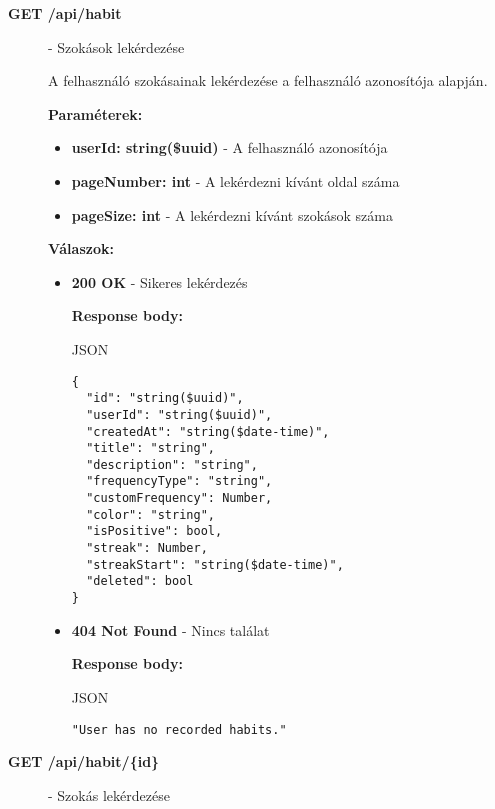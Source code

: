 \documentclass[12pt]{report}
\begin{document}
\begin{description}
  \item[\textbf{GET /api/habit}] - Szokások lekérdezése

    \vspace{0.5cm}
    A felhasználó szokásainak lekérdezése a felhasználó azonosítója alapján.

    \vspace{0.5cm}
    \textbf{Paraméterek:}
    \begin{itemize}
      \item \textbf{userId: string(\$uuid)} - A felhasználó azonosítója
      \item \textbf{pageNumber: int} - A lekérdezni kívánt oldal száma
      \item \textbf{pageSize: int} - A lekérdezni kívánt szokások száma
    \end{itemize}

    \vspace{0.5cm}
    \textbf{Válaszok:}
    \begin{itemize}
      \item \textbf{200 OK} - Sikeres lekérdezés

        \textbf{Response body:}
        \begin{codeblock}{JSON}
          \begin{verbatim}
{
  "id": "string($uuid)",
  "userId": "string($uuid)",
  "createdAt": "string($date-time)",
  "title": "string",
  "description": "string",
  "frequencyType": "string",
  "customFrequency": Number,
  "color": "string",
  "isPositive": bool,
  "streak": Number,
  "streakStart": "string($date-time)",
  "deleted": bool
}
          \end{verbatim}
        \end{codeblock}

      \item \textbf{404 Not Found} - Nincs találat
      
        \textbf{Response body:}
        \begin{codeblock}{JSON}
          \begin{verbatim}
"User has no recorded habits."
          \end{verbatim}
        \end{codeblock}
    \end{itemize}

  \item[\textbf{GET /api/habit/\{id\}}] - Szokás lekérdezése
  

\end{description}
\end{document}
